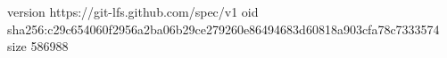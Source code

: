 version https://git-lfs.github.com/spec/v1
oid sha256:c29c654060f2956a2ba06b29ce279260e86494683d60818a903cfa78c7333574
size 586988
